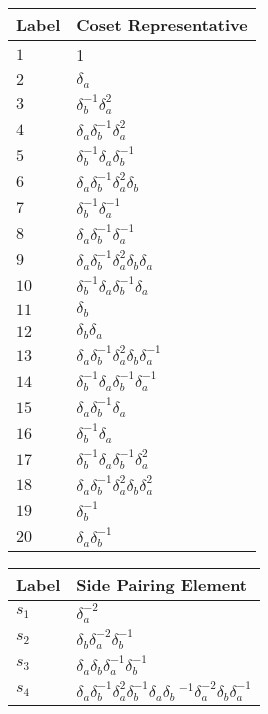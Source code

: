 \documentclass{article}
\begin{document}

\begin{center}
\begin{tabular}{ll}
\toprule
Label & Coset Representative\\
\midrule
$1$ & 1 \\
$2$ & $\delta_a^{}$ \\
$3$ & $\delta_b^{-1}\delta_a^{2}$ \\
$4$ & $\delta_a^{}\delta_b^{-1}\delta_a^{2}$ \\
$5$ & $\delta_b^{-1}\delta_a^{}\delta_b^{-1}$ \\
$6$ & $\delta_a^{}\delta_b^{-1}\delta_a^{2}\delta_b^{}$ \\
$7$ & $\delta_b^{-1}\delta_a^{-1}$ \\
$8$ & $\delta_a^{}\delta_b^{-1}\delta_a^{-1}$ \\
$9$ & $\delta_a^{}\delta_b^{-1}\delta_a^{2}\delta_b^{}\delta_a^{}$ \\
$10$ & $\delta_b^{-1}\delta_a^{}\delta_b^{-1}\delta_a^{}$ \\
$11$ & $\delta_b^{}$ \\
$12$ & $\delta_b^{}\delta_a^{}$ \\
$13$ & $\delta_a^{}\delta_b^{-1}\delta_a^{2}\delta_b^{}\delta_a^{-1}$ \\
$14$ & $\delta_b^{-1}\delta_a^{}\delta_b^{-1}\delta_a^{-1}$ \\
$15$ & $\delta_a^{}\delta_b^{-1}\delta_a^{}$ \\
$16$ & $\delta_b^{-1}\delta_a^{}$ \\
$17$ & $\delta_b^{-1}\delta_a^{}\delta_b^{-1}\delta_a^{2}$ \\
$18$ & $\delta_a^{}\delta_b^{-1}\delta_a^{2}\delta_b^{}\delta_a^{2}$ \\
$19$ & $\delta_b^{-1}$ \\
$20$ & $\delta_a^{}\delta_b^{-1}$ \\
\bottomrule
\end{tabular}
\hfill
\begin{tabular}{ll}
\toprule
Label & Side Pairing Element\\
\midrule
$s_{1}$ & $\delta_a^{-2}$ \\
$s_{2}$ & $\delta_b^{}\delta_a^{-2}\delta_b^{-1}$ \\
$s_{3}$ & $\delta_a^{}\delta_b^{}\delta_a^{-1}\delta_b^{-1}$ \\
$s_{4}$ & $\delta_a^{}\delta_b^{-1}\delta_a^{2}\delta_b^{-1}\delta_a^{}\delta_b\
^{-1}\delta_a^{-2}\delta_b^{}\delta_a^{-1}$ \\

\end{tabular}
\end{center}
\end{document}
